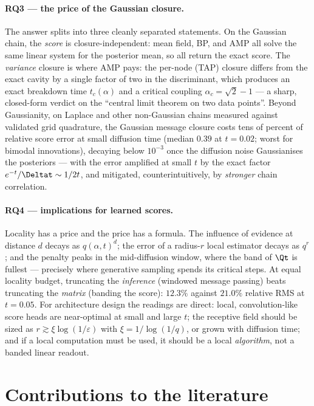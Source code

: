 \paragraph{RQ3 --- the price of the Gaussian closure.} The answer splits
into three cleanly separated statements. On the Gaussian chain, the
\emph{score} is closure-independent: mean field, BP, and AMP all solve the
same linear system for the posterior mean, so all return the exact score.
The \emph{variance} closure is where AMP pays: the per-node (TAP) closure
differs from the exact cavity by a single factor of two in the
discriminant, which produces an exact breakdown time $t_c(\alpha)$ and a
critical coupling $\alpha_c = \sqrt{2} - 1$ --- a sharp, closed-form
verdict on the ``central limit theorem on two data points''. Beyond
Gaussianity, on Laplace and other non-Gaussian chains measured against
validated grid quadrature, the Gaussian message closure costs tens of
percent of relative score error at small diffusion time (median $0.39$ at
$t = 0.02$; worst for bimodal innovations), decaying below $10^{-3}$ once
the diffusion noise Gaussianises the posteriors --- with the error
amplified at small $t$ by the exact factor $e^{-t}/\Deltat \sim 1/2t$, and
mitigated, counterintuitively, by \emph{stronger} chain correlation.

\paragraph{RQ4 --- implications for learned scores.} Locality has a price
and the price has a formula. The influence of evidence at distance $d$
decays as $q(\alpha,t)^d$; the error of a radius-$r$ local estimator
decays as $q^r$; and the penalty peaks in the mid-diffusion window, where
the band of $\Qt$ is fullest --- precisely where generative sampling
spends its critical steps. At equal locality budget, truncating the
\emph{inference} (windowed message passing) beats truncating the
\emph{matrix} (banding the score): $12.3\%$ against $21.0\%$ relative RMS
at $t = 0.05$. For architecture design the readings are direct: local,
convolution-like score heads are near-optimal at small and large $t$; the
receptive field should be sized as $r \gtrsim \xi \log(1/\varepsilon)$
with $\xi = 1/\log(1/q)$, or grown with diffusion time; and if a local
computation must be used, it should be a local \emph{algorithm}, not a
banded linear readout.

\section{Contributions to the literature}

